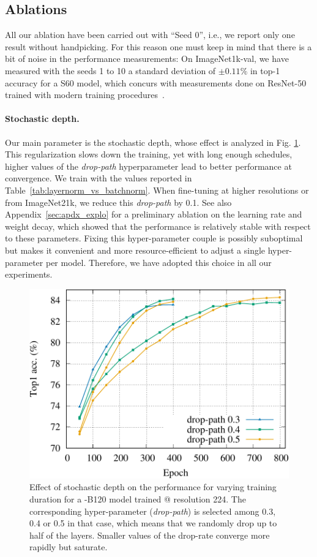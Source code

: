 \subsection{Ablations}

All our ablation have been carried out with ``Seed 0'', i.e., we report only one result without handpicking. For this reason one must keep in mind that there is a bit of noise in the performance measurements: On ImageNet1k-val, we have measured with the seeds 1 to 10 a standard deviation of $\pm 0.11\%$ in top-1 accuracy for a S60 model, which concurs with measurements done on ResNet-50 trained with modern training procedures~\cite{wightman2021resnet}. 

\paragraph{Stochastic depth.} Our main parameter is the stochastic depth, whose effect is analyzed in Fig. \ref{fig:stochastic_depth}. This regularization slows down the training, yet with long enough schedules, higher values of the \textit{drop-path} hyperparameter lead to better performance at convergence.  
We train with the values reported in Table~\ref{tab:layernorm_vs_batchnorm}. When fine-tuning at higher resolutions or from ImageNet21k, we reduce this \textit{drop-path} by 0.1. 
See also Appendix~\ref{sec:apdx_explo} for a preliminary ablation on the learning rate and weight decay, which showed that the performance is relatively stable with respect to these parameters. Fixing this hyper-parameter couple is possibly suboptimal but makes it convenient and more resource-efficient to adjust a single hyper-parameter per model. Therefore, we have adopted this choice in all our experiments. 
%


\begin{figure}
\includegraphics[width=\linewidth]{figs/stochastic_depth_vs_epoch.pdf}
\caption{Effect of stochastic depth on the performance for  varying training duration for a \ournet-B120 model trained @ resolution 224. 
The corresponding hyper-parameter (\textit{drop-path}) is selected among 0.3, 0.4 or 0.5 in that case, which means that we randomly drop up to half of the layers. Smaller values of the drop-rate converge more rapidly but saturate. 
\label{fig:stochastic_depth}} 
\end{figure}



